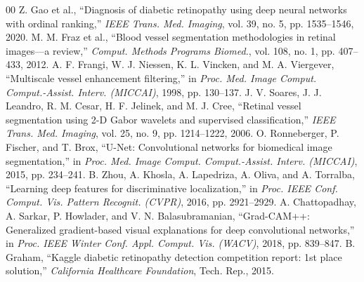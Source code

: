 \documentclass[conference]{IEEEtran}
\begin{document}
\begin{thebibliography}{00}
 Z. Gao et al., ``Diagnosis of diabetic retinopathy using deep neural networks with ordinal ranking,'' \textit{IEEE Trans. Med. Imaging}, vol. 39, no. 5, pp. 1535--1546, 2020.
 M. M. Fraz et al., ``Blood vessel segmentation methodologies in retinal images---a review,'' \textit{Comput. Methods Programs Biomed.}, vol. 108, no. 1, pp. 407--433, 2012.
 A. F. Frangi, W. J. Niessen, K. L. Vincken, and M. A. Viergever, ``Multiscale vessel enhancement filtering,'' in \textit{Proc. Med. Image Comput. Comput.-Assist. Interv. (MICCAI)}, 1998, pp. 130--137.
 J. V. Soares, J. J. Leandro, R. M. Cesar, H. F. Jelinek, and M. J. Cree, ``Retinal vessel segmentation using 2-D Gabor wavelets and supervised classification,'' \textit{IEEE Trans. Med. Imaging}, vol. 25, no. 9, pp. 1214--1222, 2006.
 O. Ronneberger, P. Fischer, and T. Brox, ``U-Net: Convolutional networks for biomedical image segmentation,'' in \textit{Proc. Med. Image Comput. Comput.-Assist. Interv. (MICCAI)}, 2015, pp. 234--241.
 B. Zhou, A. Khosla, A. Lapedriza, A. Oliva, and A. Torralba, ``Learning deep features for discriminative localization,'' in \textit{Proc. IEEE Conf. Comput. Vis. Pattern Recognit. (CVPR)}, 2016, pp. 2921--2929.
 A. Chattopadhay, A. Sarkar, P. Howlader, and V. N. Balasubramanian, ``Grad-CAM++: Generalized gradient-based visual explanations for deep convolutional networks,'' in \textit{Proc. IEEE Winter Conf. Appl. Comput. Vis. (WACV)}, 2018, pp. 839--847.
 B. Graham, ``Kaggle diabetic retinopathy detection competition report: 1st place solution,'' \textit{California Healthcare Foundation}, Tech. Rep., 2015.
\end{thebibliography}
\end{document}
